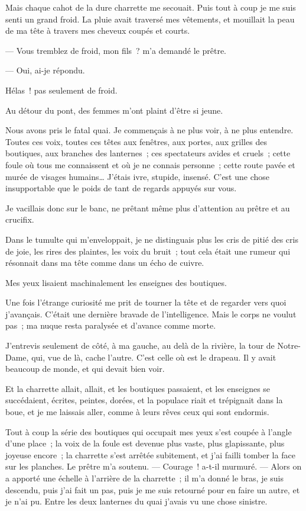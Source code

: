 \documentclass[french,twoside]{book} %
\begin{document}
Mais chaque cahot de la dure charrette me secouait. Puis tout à coup je me suis senti un grand froid. La pluie avait traversé mes vêtements, et mouillait la peau de ma tête à travers mes cheveux coupés et courts.\par
— Vous tremblez de froid, mon fils ? m’a demandé le prêtre.\par
— Oui, ai-je répondu.\par
Hélas ! pas seulement de froid.\par
Au détour du pont, des femmes m’ont plaint d’être si jeune.\par
Nous avons pris le fatal quai. Je commençais à ne plus voir, à ne plus entendre. Toutes ces voix, toutes ces têtes aux fenêtres, aux portes, aux grilles des  boutiques, aux branches des lanternes ; ces spectateurs avides et cruels ; cette foule où tous me connaissent et où je ne connais personne ; cette route pavée et murée de visages humains… J’étais ivre, stupide, insensé. C’est une chose insupportable que le poids de tant de regards appuyés sur vous.\par
Je vacillais donc sur le banc, ne prêtant même plus d’attention au prêtre et au crucifix.\par
Dans le tumulte qui m’enveloppait, je ne distinguais plus les cris de pitié des cris de joie, les rires des plaintes, les voix du bruit ; tout cela était une rumeur qui résonnait dans ma tête comme dans un écho de cuivre.\par
Mes yeux lisaient machinalement les enseignes des boutiques.\par
Une fois l’étrange curiosité me prit de tourner la tête et de regarder vers quoi j’avançais. C’était une dernière bravade de l’intelligence. Mais le corps ne voulut pas ; ma nuque resta paralysée et d’avance comme morte.\par
J’entrevis seulement de côté, à ma gauche, au delà de la rivière, la tour de Notre-Dame, qui, vue de là, cache l’autre. C’est celle où est le drapeau. Il y avait beaucoup de monde, et qui devait bien voir.\par
Et la charrette allait, allait, et les boutiques passaient, et les enseignes se succédaient, écrites, peintes, dorées, et la populace riait et trépignait dans la boue, et je me laissais aller, comme à leurs rêves ceux qui sont endormis.\par
Tout à coup la série des boutiques qui occupait  mes yeux s’est coupée à l’angle d’une place ; la voix de la foule est devenue plus vaste, plus glapissante, plus joyeuse encore ; la charrette s’est arrêtée subitement, et j’ai failli tomber la face sur les planches. Le prêtre m’a soutenu. — Courage ! a-t-il murmuré. — Alors on a apporté une échelle à l’arrière de la charrette ; il m’a donné le bras, je suis descendu, puis j’ai fait un pas, puis je me suis retourné pour en faire un autre, et je n’ai pu. Entre les deux lanternes du quai j’avais vu une chose sinistre.\par
\end{document}
